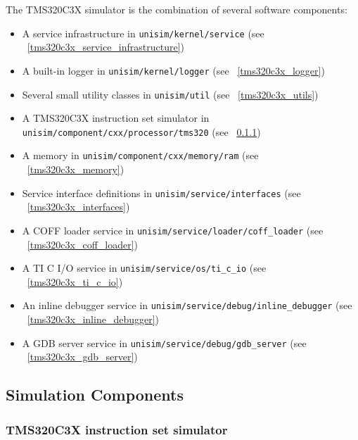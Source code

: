 The TMS320C3X simulator is the combination of several software components:
\begin{itemize}
\item A service infrastructure in \texttt{unisim/kernel/service} (see ~\ref{tms320c3x_service_infrastructure})
\item A built-in logger in \texttt{unisim/kernel/logger} (see ~\ref{tms320c3x_logger})
\item Several small utility classes in \texttt{unisim/util} (see ~\ref{tms320c3x_utils})
\item A TMS320C3X instruction set simulator in \texttt{unisim/component/cxx/processor/tms320} (see ~\ref{tms320c3x_iss})
\item A memory in \texttt{unisim/component/cxx/memory/ram} (see ~\ref{tms320c3x_memory})
\item Service interface definitions in \texttt{unisim/service/interfaces} (see ~\ref{tms320c3x_interfaces})
\item A COFF loader service in \texttt{unisim/service/loader/coff\_loader} (see ~\ref{tms320c3x_coff_loader})
\item A TI C I/O service in \texttt{unisim/service/os/ti\_c\_io} (see ~\ref{tms320c3x_ti_c_io})
\item An inline debugger service in \texttt{unisim/service/debug/inline\_debugger} (see ~\ref{tms320c3x_inline_debugger})
\item A GDB server service in \texttt{unisim/service/debug/gdb\_server} (see ~\ref{tms320c3x_gdb_server})
\end{itemize}

\subsection{Simulation Components}

\subsubsection{TMS320C3X instruction set simulator}
\label{tms320c3x_iss}

